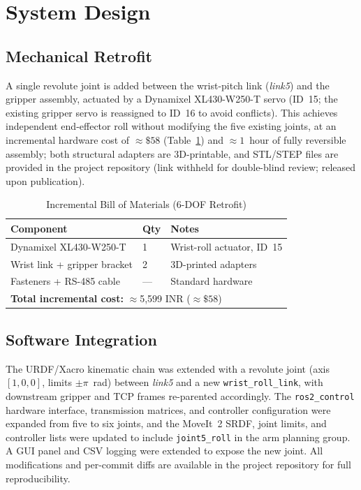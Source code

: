 \documentclass[conference]{IEEEtran}
\begin{document}
	\section{System Design}
	\label{sec:system}
	
	\subsection{Mechanical Retrofit}
	
	A single revolute joint is added between the wrist-pitch link
	(\textit{link5}) and the gripper assembly, actuated by a Dynamixel
	XL430-W250-T servo (ID~15; the existing gripper servo is reassigned
	to ID~16 to avoid conflicts). This achieves independent end-effector
	roll without modifying the five existing joints, at an incremental
	hardware cost of ${\approx}\$58$ (Table~\ref{tab:bom}) and
	${\approx}1$~hour of fully reversible assembly; both structural adapters
	are 3D-printable, and STL/STEP files are provided in the project
	repository (link withheld for double-blind review; released upon
	publication).
	
	\begin{table}[t]
		\centering
		\caption{Incremental Bill of Materials (6-DOF Retrofit)}
		\label{tab:bom}
		\small
		\begin{tabular}{lll}
			\toprule
			\textbf{Component} & \textbf{Qty} & \textbf{Notes} \\
			\midrule
			Dynamixel XL430-W250-T & 1 & Wrist-roll actuator, ID~15 \\
			Wrist link + gripper bracket & 2 & 3D-printed adapters \\
			Fasteners + RS-485 cable & --- & Standard hardware \\
			\midrule
			\multicolumn{3}{l}{\textbf{Total incremental cost:} ${\approx}$5,599 INR (${\approx}\$58$)} \\
			\bottomrule
		\end{tabular}
	\end{table}
	
	\subsection{Software Integration}
	
	The URDF/Xacro kinematic chain was extended with a revolute joint
	(axis $[1,0,0]$, limits $\pm\pi$~rad) between \textit{link5} and a
	new \texttt{wrist\_roll\_link}, with downstream gripper and TCP
	frames re-parented accordingly. The \texttt{ros2\_control} hardware
	interface, transmission matrices, and controller configuration were
	expanded from five to six joints, and the MoveIt~2 SRDF, joint
	limits, and controller lists were updated to include
	\texttt{joint5\_roll} in the arm planning group. A GUI panel and CSV
	logging were extended to expose the new joint. All modifications and
	per-commit diffs are available in the project repository for full
	reproducibility.
	
\end{document}
